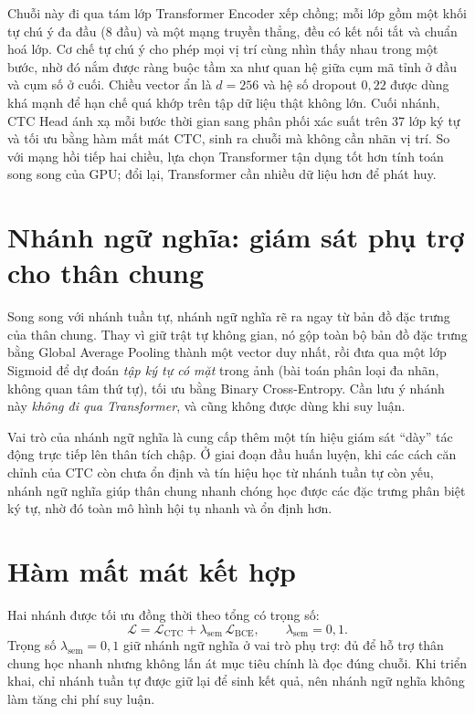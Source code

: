 \documentclass[12pt,a4paper]{report}
\begin{document}
Chuỗi này đi qua tám lớp Transformer Encoder xếp chồng; mỗi lớp gồm một khối tự chú ý đa đầu (8 đầu) và một mạng truyền thẳng, đều có kết nối tắt và chuẩn hoá lớp. Cơ chế tự chú ý cho phép mọi vị trí cùng nhìn thấy nhau trong một bước, nhờ đó nắm được ràng buộc tầm xa như quan hệ giữa cụm mã tỉnh ở đầu và cụm số ở cuối. Chiều vector ẩn là $d=256$ và hệ số dropout $0{,}22$ được dùng khá mạnh để hạn chế quá khớp trên tập dữ liệu thật không lớn. Cuối nhánh, CTC Head ánh xạ mỗi bước thời gian sang phân phối xác suất trên 37 lớp ký tự và tối ưu bằng hàm mất mát CTC, sinh ra chuỗi mà không cần nhãn vị trí. So với mạng hồi tiếp hai chiều, lựa chọn Transformer tận dụng tốt hơn tính toán song song của GPU; đổi lại, Transformer cần nhiều dữ liệu hơn để phát huy.

\section{Nhánh ngữ nghĩa: giám sát phụ trợ cho thân chung}
Song song với nhánh tuần tự, nhánh ngữ nghĩa rẽ ra ngay từ bản đồ đặc trưng của thân chung. Thay vì giữ trật tự không gian, nó gộp toàn bộ bản đồ đặc trưng bằng Global Average Pooling thành một vector duy nhất, rồi đưa qua một lớp Sigmoid để dự đoán \emph{tập ký tự có mặt} trong ảnh (bài toán phân loại đa nhãn, không quan tâm thứ tự), tối ưu bằng Binary Cross-Entropy. Cần lưu ý nhánh này \emph{không đi qua Transformer}, và cũng không được dùng khi suy luận.

Vai trò của nhánh ngữ nghĩa là cung cấp thêm một tín hiệu giám sát ``dày'' tác động trực tiếp lên thân tích chập. Ở giai đoạn đầu huấn luyện, khi các cách căn chỉnh của CTC còn chưa ổn định và tín hiệu học từ nhánh tuần tự còn yếu, nhánh ngữ nghĩa giúp thân chung nhanh chóng học được các đặc trưng phân biệt ký tự, nhờ đó toàn mô hình hội tụ nhanh và ổn định hơn.

\section{Hàm mất mát kết hợp}
Hai nhánh được tối ưu đồng thời theo tổng có trọng số:
\begin{equation}
\mathcal{L} = \mathcal{L}_{\text{CTC}} + \lambda_{\text{sem}}\,\mathcal{L}_{\text{BCE}}, \qquad \lambda_{\text{sem}} = 0{,}1.
\end{equation}
Trọng số $\lambda_{\text{sem}} = 0{,}1$ giữ nhánh ngữ nghĩa ở vai trò phụ trợ: đủ để hỗ trợ thân chung học nhanh nhưng không lấn át mục tiêu chính là đọc đúng chuỗi. Khi triển khai, chỉ nhánh tuần tự được giữ lại để sinh kết quả, nên nhánh ngữ nghĩa không làm tăng chi phí suy luận.
\end{document}
